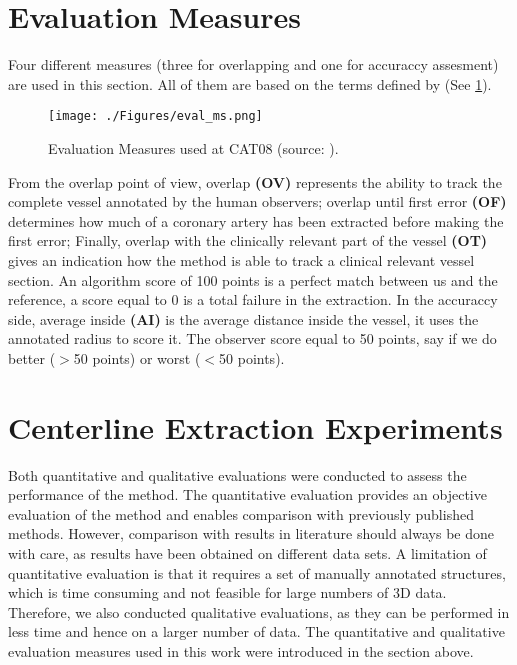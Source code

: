 \section{Evaluation Measures}

Four different measures (three for overlapping and one for accuraccy assesment) are used in this section. All of them are based on the terms defined by \citep{Schaap2009} (See \ref{fig:exp3_ms}).

\begin{figure}[htbp]
	\centering
		\texttt{[image: ./Figures/eval\_ms.png]}
	\caption[Coronary Centerline Evaluation Measures CAT08]{Evaluation Measures used at CAT08 (source: \citep{Schaap2009}).}
	\label{fig:exp3_ms}
\end{figure}

From the overlap point of view, overlap \textbf{(OV)} represents the ability to track the complete vessel annotated by the human observers; overlap until first error \textbf{(OF)} determines how much of a coronary artery has been extracted before making the first error; Finally, overlap with the clinically relevant part of the vessel \textbf{(OT)} gives an indication how the method is able to track a clinical relevant vessel section. An algorithm score of 100 points is a perfect match between us and the reference, a score equal to 0 is a total failure in the extraction. In the accuraccy side, average inside \textbf{(AI)} is the average distance inside the vessel, it uses the annotated radius to score it. The observer score equal to 50 points, say if we do better ($>$50 points) or worst ($<$50 points).

\section{Centerline Extraction Experiments}

Both quantitative and qualitative evaluations were conducted to assess the performance of the method. The quantitative evaluation provides an objective evaluation of the method and enables comparison with previously published methods. However, comparison with results in literature should always be done with care, as results have been obtained on different data sets. A limitation of quantitative evaluation is that it requires a set of manually annotated structures, which is time consuming and not feasible for large numbers of 3D data. Therefore, we also conducted qualitative evaluations, as they can be performed in less time and hence on a larger number of data. The quantitative and qualitative evaluation measures used in this work were introduced in the section above.

